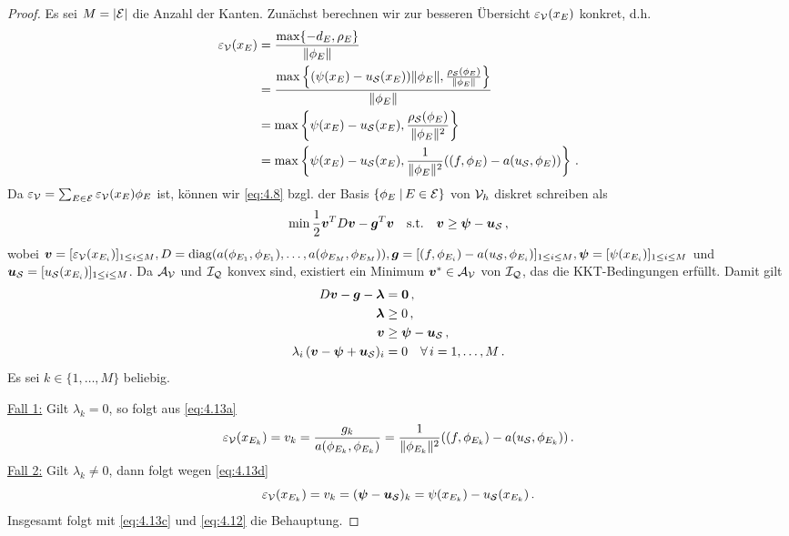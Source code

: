 \begin{itemize}
\begin{proof}
Es sei $M = \lvert \mathcal E\rvert$ die Anzahl der Kanten. Zunächst berechnen wir zur besseren Übersicht $\varepsilon_{\mathcal V}(x_E)$ konkret, d.h.
\begin{align}\notag
	\varepsilon_{\mathcal V} (x_E) & =  \frac{\max \{-d_E,\rho_E\}}{\lVert \phi_E\rVert} \\
	\notag
	& = \frac{\max \left\{(\psi (x_E)-u_{\mathcal S}(x_E) )\lVert \phi_E\rVert ,\frac{\rho_{\mathcal S}(\phi_E)}{\lVert \phi_E\rVert}\right\}}{\lVert \phi_E\rVert} \\
	\notag
	& = \max \left\{\psi (x_E)-u_{\mathcal S}(x_E)  ,\frac{\rho_{\mathcal S}(\phi_E)}{\lVert \phi_E\rVert^2}\right\} \\
	\label{eq:4.12}
	& = \max \left\{\psi (x_E)-u_{\mathcal S}(x_E)  ,\frac 1{\lVert \phi_E\rVert^2} ((f,\phi_E)-a(u_{\mathcal S},\phi_E))	\right\} \, .
\end{align}
Da  $\varepsilon_{\mathcal V} = \sum_{E \in \mathcal E} \varepsilon_{\mathcal V}(x_E) \phi_E$ ist, können wir \eqref{eq:4.8} bzgl. der Basis $\{\phi_E \;\vert\, E \in \mathcal E\}$ von $\mathcal V_h$ diskret schreiben als
\begin{align*}
	\min \frac 1 2 \boldsymbol v^T D \boldsymbol v - \boldsymbol g^T \boldsymbol v \quad \text{s.t.} \quad\boldsymbol v \ge \boldsymbol \psi - \boldsymbol u_{\mathcal S}\, , 
\end{align*}
wobei $\boldsymbol v = [\varepsilon_{\mathcal V}(x_{E_i})]_{1\le i \le M}, D = \operatorname{diag}(a(\phi_{E_1},\phi_{E_1}),\ldots,a(\phi_{E_M},\phi_{E_M})), \boldsymbol g = [(f,\phi_{E_i})-a(u_{\mathcal S},\phi_{E_i})]_{1\le i\le M}, \boldsymbol \psi = [\psi(x_{E_i})]_{1\le i \le M}$ und $ \boldsymbol u_{\mathcal S} = [u_{\mathcal S}(x_{E_i})]_{1\le i \le M}$. Da $\mathcal A_{\mathcal V}$ und $\mathcal I_{\mathcal Q}$ konvex sind, existiert ein Minimum $\boldsymbol v^* \in \mathcal A_{\mathcal V}$ von $\mathcal I_{\mathcal Q}$, das die KKT-Bedingungen erfüllt. Damit gilt
\begin{subequations}\label{eq:4.13}
\begin{align}\label{eq:4.13a}
	D \boldsymbol v-\boldsymbol g - \boldsymbol \lambda & = \boldsymbol 0 \, , \\
	\label{eq:4.13b}
	\boldsymbol \lambda &\ge 0\, ,\\
	\label{eq:4.13c}
	\boldsymbol v & \ge \boldsymbol \psi - \boldsymbol u_{\mathcal S}\,  , \\
	\label{eq:4.13d}
	\lambda_i\, (\boldsymbol v - \boldsymbol \psi+\boldsymbol u_{\mathcal S})_i &= 0 \quad \forall \, i=1,\ldots,M \, .
\end{align}
\end{subequations}
Es sei $k \in \{1,\ldots,M\}$ beliebig.

\underline{Fall 1:} Gilt $\lambda_k = 0$, so folgt aus \eqref{eq:4.13a}
\[
	\varepsilon_{\mathcal V} (x_{E_k}) = v_k = \frac {g_k}{a(\phi_{E_k},\phi_{E_k})} = \frac 1{\lVert \phi_{E_k}\rVert^2} ((f,\phi_{E_k})-a(u_{\mathcal S},\phi_{E_k})) \, .
\]
\underline{Fall 2:} Gilt $\lambda_k \not= 0$, dann folgt wegen \eqref{eq:4.13d}
\[
	\varepsilon_{\mathcal V} (x_{E_k}) =v_k = (\boldsymbol \psi - \boldsymbol u_{\mathcal S})_k = \psi(x_{E_k}) - u_{\mathcal S}(x_{E_k})\, .
\]
Insgesamt folgt mit \eqref{eq:4.13c} und \eqref{eq:4.12} die Behauptung.
\end{proof}


\end{itemize}

